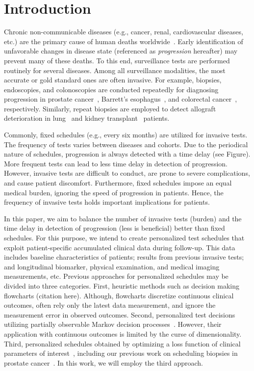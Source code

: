 \section{Introduction}
\label{sec:introduction}
Chronic non-communicable diseases (e.g., cancer, renal, cardiovascular diseases, etc.) are the primary cause of human deaths worldwide~\citep{alwan2010monitoring}. Early identification of unfavorable changes in disease state (referenced as \textit{progression} hereafter) may prevent many of these deaths. To this end, surveillance tests are performed routinely for several diseases. Among all surveillance modalities, the most accurate or gold standard ones are often invasive. For example, biopsies, endoscopies, and colonoscopies are conducted repeatedly for diagnosing progression in prostate cancer~\citep{bokhorst2016decade}, Barrett's esophagus~\citep{streitz1993endoscopic}, and colorectal cancer~\citep{lieberman2012guidelines}, respectively. Similarly, repeat biopsies are employed to detect allograft deterioration in lung~\citep{mcwilliams2008surveillance} and kidney transplant~\citep{henderson2011surveillance} patients. 

Commonly, fixed schedules (e.g., every six months) are utilized for invasive tests. The frequency of tests varies between diseases and cohorts. Due to the periodical nature of schedules, progression is always detected with a time delay (see Figure). More frequent tests can lead to less time delay in detection of progression. However, invasive tests are difficult to conduct, are prone to severe complications, and cause patient discomfort. Furthermore, fixed schedules impose an equal medical burden, ignoring the speed of progression in patients. Hence, the frequency of invasive tests holds important implications for patients.

In this paper, we aim to balance the number of invasive tests (burden) and the time delay in detection of progression (less is beneficial) better than fixed schedules. For this purpose, we intend to create personalized test schedules that exploit patient-specific accumulated clinical data during follow-up. This data includes baseline characteristics of patients; results from previous invasive tests; and longitudinal biomarker, physical examination, and medical imaging measurements, etc. Previous approaches for personalized schedules may be divided into three categories. First, heuristic methods such as decision making flowcharts (citation here). Although, flowcharts discretize continuous clinical outcomes, often rely only the latest data measurement, and ignore the measurement error in observed outcomes. Second, personalized test decisions utilizing partially observable Markov decision processes~\citep{alagoz2010operations, steimle2017markov}. However, their application with continuous outcomes is limited by the curse of dimensionality. Third, personalized schedules obtained by optimizing a loss function of clinical parameters of interest~\citep{bebu2017optimal,rizopoulos2015personalized}, including our previous work on scheduling biopsies in prostate cancer~\citep{tomer2019personalized}. In this work, we will employ the third approach.


